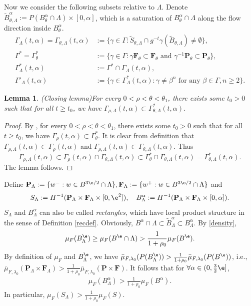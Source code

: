 \documentclass[11pt]{amsart}
\newtheorem{lemma}[theorem]{Lemma}
\theoremstyle{definition}
\def\a{\alpha}
\def\b{\beta}
\def\c{\gamma}   \def\C{\Gamma}
\def\l{\lambda}   \def\L{\Lambda}
\def\bP{\textbf{P}}
\def\bF{\textbf{F}}
\begin{document}
Now we consider the following subsets relative to $\L$. Denote $\tilde B_{\theta,\L}^\a:=P(B_{\theta}^\a\cap \L)\times [0,\a]$, which is a saturation of $B_{\theta}^\a\cap \L$ along the flow direction inside $B_{\theta}^\a$.
\begin{equation*}
\begin{aligned}
\C_\L(t,\a)=\C_{\theta,\L}(t,\a)&:=\{\c\in \C: \tilde S_{\theta,\L}\cap g^{-t}\c (\tilde B_{\theta,\L})\neq \emptyset\},\\
\C^*=\C^*_\theta&:=\{\c\in \C: \c\bF_\theta \subset \bF_\theta \text{\ and\ }\c^{-1}\bP_\theta\subset \bP_\theta\},\\
\C_\L^*(t,\a)&:=\C^*\cap \C_\L(t,\a),\\
\C'_\L(t,\a)&:=\{\c\in \C_\L^*(t,\a): \c\neq \b^n \text{\ for any\ } \b\in \C, n\ge 2\}.
\end{aligned}
\end{equation*}


\begin{lemma}(Closing lemma)\label{closing}
For every $0<\rho<\theta<\theta_1$, there exists some $t_0> 0$ such that for all $t\ge t_0$, we have $\C_{\rho,\L}(t,\a)\subset \C_{\theta,\L}^*(t,\a)$.
\end{lemma}
\begin{proof}
By \cite[Lemma 3.11]{Wu2}, for every $0<\rho<\theta<\theta_1$, there exists some $t_0> 0$ such that for all $t\ge t_0$, we have $\C_\rho(t,\a)\subset \C_\theta^*$. 
It is clear from definition that $\C_{\rho,\L}(t,\a)\subset \C_\rho(t,\a)$ and $\C_{\rho,\L}(t,\a)\subset \C_{\theta,\L}(t,\a)$. Thus
\[\C_{\rho,\L}(t,\a)\subset \C_\rho(t,\a)\cap  \C_{\theta,\L}(t,\a)\subset \C_\theta^*\cap  \C_{\theta,\L}(t,\a)=\C_{\theta,\L}^*(t,\a).\]
The lemma follows.
\end{proof}

Define $\bP_{\L}:=\{w^-: w\in B^{3\e/2}\cap \L\}, \bF_{\L}:=\{w^+: w\in B^{3\e/2}\cap \L\}$ and
$$S_\L:=H^{-1}(\bP_\L\times \bF_\L\times [0,\e^2]), \quad B^\a_\L:=H^{-1}(\bP_\L\times \bF_\L\times [0,\a]).$$
$S_\L$ and $B_\L^\a$ can also be called \emph{rectangles}, which have local product structure in the sense of Definition \ref{recdef}. Obviously, $B^\a\cap \L\subset \tilde B^\a_\L\subset B^\a_\L$.
By \eqref{density}, 
\[\mu_F(B^\e_\L)\ge \mu_F(B^\e\cap \L)>\frac{1}{1+\rho_0}\mu_F(B^\e).\]
By definition of $\mu_F$ and $B^\e_\L$, we have $\bar{\mu}_{F,\l_0}(P(B^\e_\L))>\frac{1}{1+\rho_0}\bar\mu_{F,\l_0}(P(B^\e))$, i.e.,  $\bar{\mu}_{F,\l_0}(\bP_\L\times \bF_\L)>\frac{1}{1+\rho_0}\bar\mu_{F,\l_0}(\bP\times \bF)$. It follows that for $\forall \a\in (0,\frac{3}{2}\e]$,
\begin{equation}\label{density2}
\begin{aligned}
\mu_F(B^\a_\L) >\frac{1}{1+\rho_0}\mu_F(B^\a).
\end{aligned}
\end{equation}
In particular, $\mu_F(S_\L)>\frac{1}{1+\rho_0}\mu_F(S)$.
\end{document}
